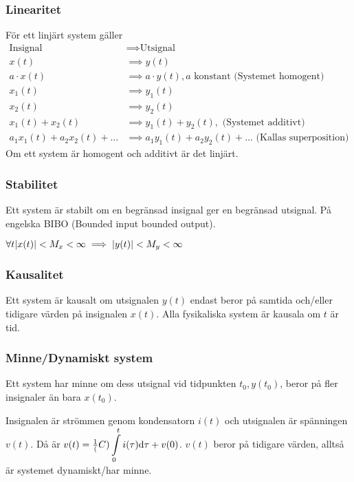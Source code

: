\documentclass[a4paper]{article}
\begin{document}
\subsubsection{Linearitet}
För ett linjärt system gäller 
\begin{align*}
    \text{Insignal} &\implies \text{Utsignal} \\
    x(t) &\implies y(t) \\
    a\cdot x(t) &\implies a\cdot y(t), a \text{ konstant (Systemet homogent)}  \\
    x_1(t) &\implies y_1(t) \\
    x_2(t) &\implies y_2(t) \\
    x_1(t) + x_2(t) &\implies y_1(t) + y_2(t), \text{ (Systemet additivt)}  \\
    a_1x_1(t) + a_2x_2(t)+\dots &\implies a_1y_1(t)+a_2y_2(t)+\dots \text{ (Kallas superposition)} 
\end{align*}
Om ett system är homogent och additivt är det linjärt.

\subsubsection{Stabilitet}
Ett system är stabilt om en begränsad insignal ger en begränsad utsignal. 
På engelska BIBO (Bounded input bounded output).

\(
    \forall t \abs{x(t)} < M_x < \infty \implies \abs{y(t)} < M_y < \infty
\) 

\subsubsection{Kausalitet}
Ett system är kausalt om utsignalen \(
    y(t)
\) endast beror på samtida och/eller tidigare värden på insignalen \(
    x(t)
\). Alla fysikaliska system är kausala om \(
    t 
\) är tid.

\subsubsection{Minne/Dynamiskt system}
Ett system har minne om dess utsignal vid tidpunkten \(
    t_0, y(t_0)
\), beror på fler insignaler än bara \(
    x(t_0)
\). 

\begin{ex}
    Insignalen är strömmen genom kondensatorn \(
        i(t)
    \) och utsignalen är spänningen \(
        v(t)
    \). Då är \(
        v(t) = \frac{1}{(}C) \displaystyle\int\limits_0^t i(\tau) \dd \tau + v(0)
    \). \(
        v(t)
    \) beror på tidigare värden, alltså är systemet dynamiskt/har minne.
\end{ex}
\end{document}
